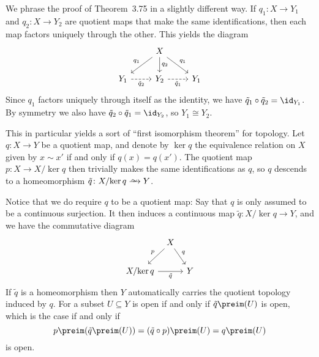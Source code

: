 \documentclass[article, a4paper, 11pt, oneside]{memoir}
\numberwithin{equation}{chapter}
\theoremstyle{nonumberplain}
\begin{document}
\begin{remarkbreak}
    We phrase the proof of Theorem~3.75 in a slightly different way. If $q_1 \colon X \to Y_1$ and $q_2 \colon X \to Y_2$ are quotient maps that make the same identifications, then each map factors uniquely through the other. This yields the diagram
    \begin{equation*}
        \begin{tikzcd}
            & X
                \ar[dl, "q_1", swap]
                \ar[d, "q_2"]
                \ar[dr, "q_1"] \\
            Y_1
                \ar[r, dashed, "\tilde{q}_2", swap]
            & Y_2
                \ar[r, dashed, "\tilde{q}_1", swap]
            & Y_1
        \end{tikzcd}
    \end{equation*}
    Since $q_1$ factors uniquely through itself as the identity, we have $\tilde{q}_1 \circ \tilde{q}_2 = \id_{Y_1}$. By symmetry we also have $\tilde{q}_2 \circ \tilde{q}_1 = \id_{Y_2}$, so $Y_1 \cong Y_2$.

    This in particular yields a sort of \enquote{first isomorphism theorem} for topology. Let $q \colon X \to Y$ be a quotient map, and denote by $\ker q$ the equivalence relation on $X$ given by $x \sim x'$ if and only if $q(x) = q(x')$. The quotient map $p \colon X \to X/{\ker q}$ then trivially makes the same identifications as $q$, so $q$ descends to a homeomorphism $\tilde{q} \colon X/{\ker q} \congto Y$.
    
    Notice that we do require $q$ to be a quotient map: Say that $q$ is only assumed to be a continuous surjection. It then induces a continuous map $\tilde{q} \colon X/{\ker q} \to Y$, and we have the commutative diagram
    \begin{equation*}
        \begin{tikzcd}[column sep=tiny]
            & X
                \ar[dl, "p", swap]
                \ar[dr, "q"] \\
            X/{\ker q}
                \ar[rr, "\tilde{q}", swap]
            && Y
        \end{tikzcd}
    \end{equation*}
    If $\tilde{q}$ is a homeomorphism then $Y$ automatically carries the quotient topology induced by $q$. For a subset $U \subseteq Y$ is open if and only if $\tilde{q}\preim(U)$ is open, which is the case if and only if
    \begin{equation*}
        p\preim(\tilde{q}\preim(U))
            = (\tilde{q} \circ p)\preim(U)
            = q\preim(U)
    \end{equation*}
    is open.
\end{remarkbreak}
\end{document}
